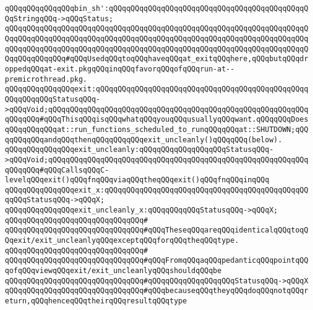 \newline
\verb|qQQqqQQqqQQqqQQqbin_sh':qQQqqQQqqQQqqQQqqQQqqQQqqQQqqQQqqQQqqQQqqQQqqQQqStringqQQq->qQQqStatus;|\newline
\newline
\verb|qQQqqQQqqQQqqQQqqQQqqQQqqQQqqQQqqQQqqQQqqQQqqQQqqQQqqQQqqQQqqQQqqQQqqQQqqQQqqQQqqQQqqQQqqQQqqQQqqQQqqQQqqQQqqQQqqQQqqQQqqQQqqQQqqQQqqQQqqQQqqQQqqQQqqQQqqQQqqQQqqQQqqQQqqQQqqQQqqQQqqQQqqQQqqQQqqQQqqQQqqQQqqQQqqQQqqQQqqQQqqQQq#qQQqUsedqQQqtoqQQqhaveqQQqat_exitqQQqhere,qQQqbutqQQqdroppedqQQqat-exit.pkgqQQqinqQQqfavorqQQqofqQQqrun-at--premicrothread.pkg.|\newline
\newline
\verb|qQQqqQQqqQQqqQQqexit:qQQqqQQqqQQqqQQqqQQqqQQqqQQqqQQqqQQqqQQqqQQqqQQqqQQqqQQqqQQqStatusqQQq->qQQqVoid;qQQqqQQqqQQqqQQqqQQqqQQqqQQqqQQqqQQqqQQqqQQqqQQqqQQqqQQqqQQqqQQqqQQq#qQQqThisqQQqisqQQqwhatqQQqyouqQQqusuallyqQQqwant.qQQqqQQqDoesqQQqqQQqqQQqat::run_functions_scheduled_to_runqQQqqQQqat::SHUTDOWN;qQQqqQQqqQQqandqQQqthenqQQqqQQqqQQqexit_uncleanly()qQQqqQQq(below).|\newline
\verb|qQQqqQQqqQQqqQQqexit_uncleanly:qQQqqQQqqQQqqQQqqQQqStatusqQQq->qQQqVoid;qQQqqQQqqQQqqQQqqQQqqQQqqQQqqQQqqQQqqQQqqQQqqQQqqQQqqQQqqQQqqQQqqQQq#qQQqCallsqQQqC-levelqQQqexit()qQQqfnqQQqviaqQQqtheqQQqexit()qQQqfnqQQqinqQQq|\newline
\newline
\verb|qQQqqQQqqQQqqQQqexit_x:qQQqqQQqqQQqqQQqqQQqqQQqqQQqqQQqqQQqqQQqqQQqqQQqqQQqStatusqQQq->qQQqX;|\newline
\verb|qQQqqQQqqQQqqQQqexit_uncleanly_x:qQQqqQQqqQQqStatusqQQq->qQQqX;|\newline
\verb|qQQqqQQqqQQqqQQqqQQqqQQqqQQqqQQq#|\newline
\verb|qQQqqQQqqQQqqQQqqQQqqQQqqQQqqQQq#qQQqTheseqQQqareqQQqidenticalqQQqtoqQQqexit/exit_uncleanlyqQQqexceptqQQqforqQQqtheqQQqtype.|\newline
\verb|qQQqqQQqqQQqqQQqqQQqqQQqqQQqqQQq#|\newline
\verb|qQQqqQQqqQQqqQQqqQQqqQQqqQQqqQQq#qQQqFromqQQqaqQQqpedanticqQQqpointqQQqofqQQqviewqQQqexit/exit_uncleanlyqQQqshouldqQQqbe|\newline
\verb|qQQqqQQqqQQqqQQqqQQqqQQqqQQqqQQq#qQQqqQQqqQQqqQQqqQQqStatusqQQq->qQQqX|\newline
\verb|qQQqqQQqqQQqqQQqqQQqqQQqqQQqqQQq#qQQqbecauseqQQqtheyqQQqdoqQQqnotqQQqreturn,qQQqhenceqQQqtheirqQQqresultqQQqtype|\newline
